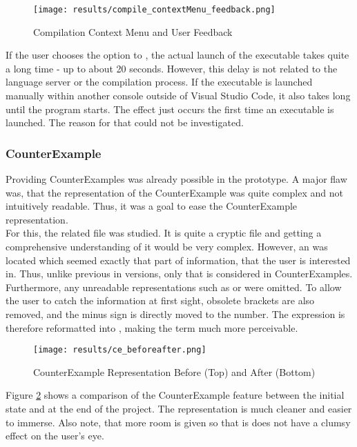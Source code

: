 \begin{figure}[H]
    \centering
    \texttt{[image: results/compile\_contextMenu\_feedback.png]}
    \caption{Compilation Context Menu and User Feedback}
    \label{fig:compilation_stuff}
\end{figure}


If the user chooses the option to , the actual launch of the executable takes quite a long time - up to about 20 seconds.
However, this delay is not related to the language server or the compilation process.
If the executable is launched manually within another console outside of Visual Studio Code, it also takes long until the program starts.
The effect just occurs the first time an executable is launched.
The reason for that could not be investigated.

\subsubsection{CounterExample}
Providing CounterExamples was already possible in the prototype.
A major flaw was, that the representation of the CounterExample was quite complex and not intuitively readable.
Thus, it was a goal to ease the CounterExample representation.\\

For this, the related  file was studied.
It is quite a  cryptic file and getting a comprehensive understanding of it would be very complex.
However, an  was located which seemed exactly that part of information, that the user is interested in.
Thus, unlike previous in versions, only that  is considered in CounterExamples.
Furthermore, any unreadable representations such as  or  were omitted.
To allow the user to catch the information at first sight, obsolete brackets are also removed, and the minus sign is directly moved to the number.
The expression  is therefore reformatted into , making the term much more perceivable.

\begin{figure}[H]
    \centering
    \texttt{[image: results/ce\_beforeafter.png]}
    \caption{CounterExample Representation Before (Top) and After (Bottom)}
    \label{fig:ce_beforeafter}
\end{figure}

Figure \ref{fig:ce_beforeafter} shows a comparison of the CounterExample feature between the initial state and at the end of the project.
The representation is much cleaner and easier to immerse.
Also note, that more room is given so that is does not have a clumsy effect on the user's eye. \\


